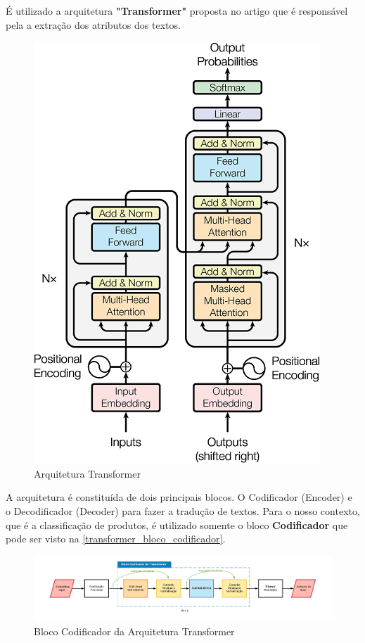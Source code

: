 É utilizado a arquitetura \textbf{"Transformer"} proposta no artigo \cite{transformer} que é responsável pela a extração dos atributos dos textos.

\begin{figure}[htb]
	\caption{\label{transformer_architecture} Arquitetura Transformer}
	\begin{center}
	    \includegraphics[scale=0.5]{artigo/recursos/imagens/transformer_architecture.png}
	\end{center}
\end{figure}

A arquitetura é constituída de dois principais blocos. O Codificador (Encoder) e o Decodificador (Decoder) para fazer a tradução de textos. Para o nosso contexto, que é a classificação de produtos, é utilizado somente o bloco \textbf{Codificador} que pode ser visto na \autoref{transformer_bloco_codificador}.

\begin{figure}[htb]
	\caption{\label{transformer_bloco_codificador} Bloco Codificador da Arquitetura Transformer}
	\begin{center}
	    \includegraphics[scale=0.5]{artigo/recursos/imagens/transformer_bloco_codificador.png}
	\end{center}
\end{figure}

